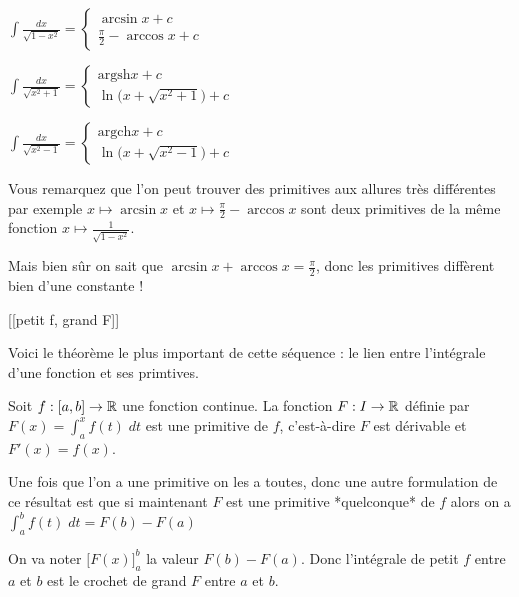 \change

   $\int\frac{dx}{\sqrt{1-x^2}} = \left\{ \begin{array}{l}
   \arcsin x + c \\ \frac\pi2-\arccos x +c \end{array} \right.$ 

\change

   $\int \frac{dx}{\sqrt {x^2+1}}=  \left\{ \begin{array}{l} \mbox{argsh} x+c \\
   \ln\big(x+\sqrt{x^2+1}\big)+c  \end{array} \right.$ 

\change

   $\int \frac{dx}{\sqrt {x^2-1}} = \left\{ \begin{array}{l} \mbox{argch} x+c \\ 
   \ln\big(x+\sqrt{x^2-1}\big)+c \end{array} \right.$

Vous remarquez que l'on peut trouver des primitives aux allures très différentes par exemple $x\mapsto \arcsin x$ et 
$x\mapsto \frac{\pi}{2}-\arccos x$ sont deux primitives de la même fonction $x\mapsto \frac{1}{\sqrt{1-x^2}}$.

Mais bien sûr on sait que $\arcsin x + \arccos x = \frac\pi2$, donc les primitives diffèrent bien d'une constante !

\diapo

[[petit f, grand F]]

Voici le théorème le plus important de cette séquence : 
le lien entre l'intégrale d'une fonction et ses primtives.


Soit $f : [a,b] \to \mathbb{R}$ une fonction continue.
La fonction $F:I \to \mathbb{R}$ définie par
$\displaystyle F(x)=\int_a^x f(t) \; dt$
est une primitive de $f$, c'est-à-dire $F$ est dérivable et $F'(x)=f(x)$.


\change

Une fois que l'on a une primitive on les a toutes, donc une autre formulation de ce résultat
est que si maintenant $F$ est une primitive *quelconque* de $f$
alors on a 
$\int_a^b f(t) \; dt = F(b)-F(a)$


\change

On va noter $\big[F(x)\big]_a^b$ la valeur $F(b)-F(a)$.
Donc l'intégrale de petit $f$ entre $a$ et $b$ est le crochet de grand $F$ entre $a$ et $b$.

\change

